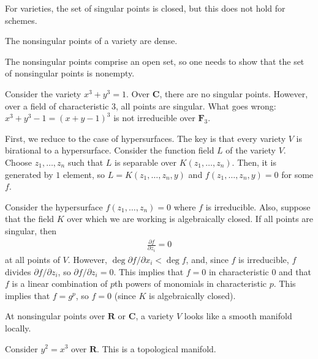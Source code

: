 \documentclass [11 pt, oneside] {article}
\begin{document}
\begin{warn}
	For varieties, the set of singular points is closed, but this does not hold for schemes.
\end{warn}

\begin{proposition}[ ]\label{}\text{}
The nonsingular points of a variety are dense.
\end{proposition}

The nonsingular points comprise an open set, so one needs to show that the set of nonsingular points is nonempty. 

\begin{example}[ ]\label{}\text{}
Consider the variety $x^3+y^3=1$. Over $\mathbf{C}$, there are no singular points. However, over a field of characteristic $3$, all points are singular. What goes wrong: $x^3+y^3-1=(x+y-1)^3$ is not irreducible over $\mathbf{F}_{3}$.
\end{example}


First, we reduce to the case of hypersurfaces. The key is that every variety $V$ is birational to a hypersurface. Consider the function field $L$ of the variety $V$. Choose $z_1,\hdots, z_n$ such that $L$ is separable over $K(z_1,\hdots, z_n)$. Then, it is generated by $1$ element, so $L=K(z_1,\hdots, z_n,y)$ and $f(z_1,\hdots, z_n,y)=0$ for some $f$.

Consider the hypersurface $f(z_1,\hdots, z_n)=0$ where $f$ is irreducible. Also, suppose that the field $K$ over which we are working is algebraically closed. If all points are singular, then 
\begin{align*}
	\frac{\partial f}{\partial z_i} =0
\end{align*}
at all points of $V$. However, $\deg \partial f/\partial x_i< \deg f$, and, since $f$ is irreducible, $f$ divides $\partial f/\partial z_i$, so $\partial f/\partial z_i =0$. This implies that $f=0$ in characteristic $0$ and that $f$ is a linear combination of $p$th powers of monomials in characteristic $p$. This implies that $f=g^p$, so $f=0$ (since $K$ is algebraically closed).

 \begin{remark}\label{convvv}
	At nonsingular points over $\mathbf{R}$ or $\mathbf{C}$, a variety $V$ looks like a smooth manifold locally.
\end{remark}

\begin{example}\label{}\text{}
Consider $y^2=x^3$ over $\mathbf{R}$. This is a topological manifold.
\end{example}
\end{document}
